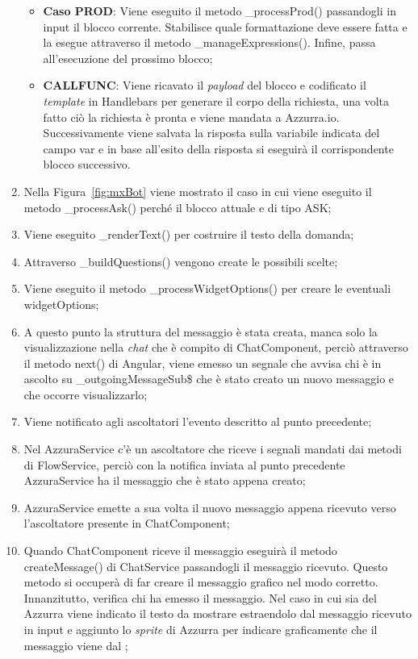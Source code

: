 \begin{enumerate}
\begin{itemize}
		\item \textbf{Caso PROD}: Viene eseguito il metodo \_processProd() passandogli in input il blocco corrente. Stabilisce quale formattazione deve essere fatta e la esegue attraverso il metodo \_manageExpressions(). Infine, passa all'esecuzione del prossimo blocco;
		\item \textbf{CALLFUNC}: Viene ricavato il \emph{payload} del blocco e codificato il \emph{template} in Handlebars per generare il corpo della richiesta, una volta fatto ciò la richiesta è pronta e viene mandata a Azzurra.io. Successivamente viene salvata la risposta sulla variabile indicata del campo var e in base all'esito della risposta si eseguirà il corrispondente blocco successivo.
	\end{itemize}	
	\item Nella Figura~\ref{fig:mxBot} viene mostrato il caso in cui viene eseguito il metodo \_processAsk() perché il blocco attuale e di tipo ASK;
	\item Viene eseguito \_renderText() per costruire il testo della domanda;
	\item Attraverso \_buildQuestions() vengono create le possibili scelte;
	\item Viene eseguito il metodo \_processWidgetOptions() per creare le eventuali widgetOptions;
	\item A questo punto la struttura del messaggio è stata creata, manca solo la visualizzazione nella \emph{chat} che è compito di ChatComponent, perciò attraverso il metodo next() di Angular, viene emesso un segnale che avvisa chi è in ascolto su \_outgoingMessageSub\$ che è stato creato un nuovo messaggio e che occorre visualizzarlo;
	\item Viene notificato agli ascoltatori l'evento descritto al punto precedente;
	\item Nel AzzuraService c'è un ascoltatore che riceve i segnali mandati dai metodi di FlowService, perciò con la notifica inviata al punto precedente AzzuraService ha il messaggio che è stato appena creato;
	\item AzzuraService emette a sua volta il nuovo messaggio appena ricevuto verso l'ascoltatore presente in ChatComponent;
	\item Quando ChatComponent riceve il messaggio eseguirà il metodo createMessage() di ChatService passandogli il messaggio ricevuto. Questo metodo si occuperà di far creare il messaggio grafico nel modo corretto.
	Innanzitutto, verifica chi ha emesso il messaggio. Nel caso in cui sia del  Azzurra viene indicato il testo da mostrare estraendolo dal messaggio ricevuto in input e aggiunto lo \emph{sprite} di Azzurra per indicare graficamente che il messaggio viene dal ;

\end{enumerate}
